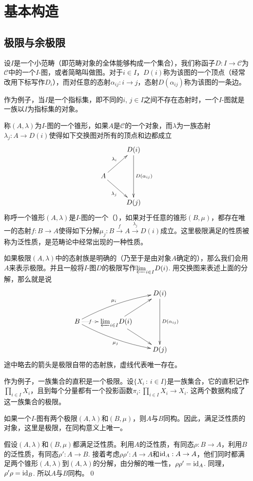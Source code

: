 \chapter{基本构造}

\section{极限与余极限}

\para 设$I$是一个小范畴（即范畴对象的全体能够构成一个集合），我们称函子$D:I\to \mathcal{C}$为$\mathcal{C}$中的一个$I$-图，或者简略叫做图。对于$i\in I$，$D(i)$称为该图的一个顶点（经常改用下标写作$D_i$），而对任意的态射$\alpha_{ij}:i\to j$，态射$D(\alpha_{ij})$称为该图的一条边。

作为例子，当$I$是一个指标集，即不同的$i$, $j\in I$之间不存在态射时，一个$I$-图就是一族以$I$为指标集的对象。

\para 称$(A,\lambda)$为$I$-图的一个{锥形}，如果$A$是$\mathcal{C}$的一个对象，而$\lambda$为一族态射$\lambda_{j}:A\to D(i)$使得如下交换图对所有的顶点和边都成立
\[
	\xymatrix{
		&D(i)\ar[dd]^{D(\alpha_{ij})}\\
		A\ar[ru]^{\lambda_i}\ar[rd]_{\lambda_j}&\\
		&D(j)
	}
\]
称呼一个锥形$(A,\lambda)$是$I$-图的一个（），如果对于任意的锥形$(B,\mu)$，都存在唯一的态射$f:B\to A$使得如下分解$\mu_j:B\xrightarrow{f}A\xrightarrow{\lambda_j}D(i)$成立。这里极限满足的性质被称为泛性质，是范畴论中经常出现的一种性质。

如果极限$(A,\lambda)$中的态射族是明确的（乃至于是由对象$A$确定的），那么我们会用$A$来表示极限。并且一般将$I$-图$D$的极限写作${\varprojlim}_{i\in I} D(i)$. 用交换图来表述上面的分解，那么就是说
\[
	\xymatrix{
		&&D(i)\ar[dd]^{D(\alpha_{ij})}\\
		B\ar@{.>}[r]|-{f}\ar@/^/[rru]^-{\mu_i}\ar@/_/[rrd]_{\mu_j}&{\varprojlim}_{i\in I} D(i)\ar[ru]\ar[rd]&\\
		&&D(j)
	}
\]
途中略去的箭头是极限自带的态射族，虚线代表唯一存在。

作为例子，一族集合的直积是一个极限。设$\{X_i\,:\, i\in I\}$是一族集合，它的直积记作$\prod_{i\in I}X_i$，且到每个分量都有一个投影函数$\pi_i:\prod_{i\in I}X_i\to X_i$. 这两个数据构成了这一族集合的极限。

\pro 如果一个$I$-图有两个极限$(A,\lambda)$和$(B,\mu)$，则$A$与$B$同构。因此，满足泛性质的对象，这里是极限，在同构意义上唯一。

\proof 假设$(A,\lambda)$和$(B,\mu)$都满足泛性质。利用$A$的泛性质，有同态$\rho:B\to A$，利用$B$的泛性质，有同态$\rho':A\to B$. 接着考虑$\rho \rho':A\to A$和$\operatorname{id}_A:A\to A$，他们同时都满足两个锥形$(A,\lambda)$到$(A,\lambda)$的分解，由分解的唯一性，$\rho\rho'=\operatorname{id}_A$. 同理，$\rho'\rho=\operatorname{id}_{B}$. 所以$A$与$B$同构。\qed

